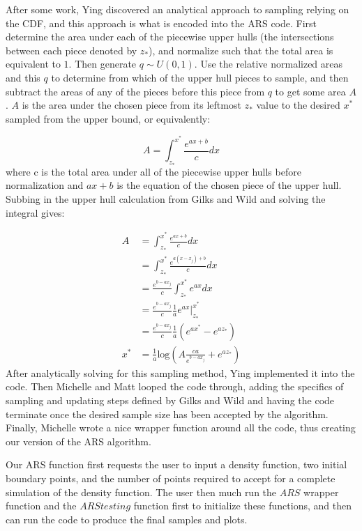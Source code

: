 \documentclass{article}
\begin{document}
After some work, Ying discovered an analytical approach to sampling relying on the CDF, and this approach is what is encoded into the ARS code.  First determine the area under each of the piecewise upper hulls (the intersections between each piece denoted by $z_*$), and normalize such that the total area is equivalent to $1$.  Then generate $q\sim U\left(0, 1\right)$.  Use the relative normalized areas and this $q$ to determine from which of the upper hull pieces to sample, and then subtract the areas of any of the pieces before this piece from $q$ to get some area $A$.  $A$ is the area under the chosen piece from its leftmost $z_*$ value to the desired $x^*$ sampled from the upper bound, or equivalently:

$$A=\int_{z_*}^{x^*}\frac{e^{ax+b}}{c}dx$$
where c is the total area under all of the piecewise upper hulls before normalization and $ax+b$ is the equation of the chosen piece of the upper hull.  Subbing in the upper hull calculation from Gilks and Wild and solving the integral gives:

\begin{align*}
A &= \int_{z_*}^{x^*}\frac{e^{ax+b}}{c}dx\\
&= \int_{z_*}^{x^*}\frac{e^{a\left(x-x_j\right)+b}}{c}dx\\
&= \frac{e^{b-ax_j}}{c}\int_{z_*}^{x^*}e^{ax}dx\\
&= \frac{e^{b-ax_j}}{c}\frac{1}{a}\left.e^{ax}\right|_{z_*}^{x^*}\\
&= \frac{e^{b-ax_j}}{c}\frac{1}{a}\left(e^{ax^*} - e^{az_*}\right)\\
x^* &= \frac{1}{a}\text{log}\left(A\frac{ca}{e^{b-ax_j}}+e^{az_*}\right)
\end{align*}
After analytically solving for this sampling method, Ying implemented it into the code.  Then Michelle and Matt looped the code through, adding the specifics of sampling and updating steps defined by Gilks and Wild and having the code terminate once the desired sample size has been accepted by the algorithm.  Finally, Michelle wrote a nice wrapper function around all the code, thus creating our version of the ARS algorithm.

Our ARS function first requests the user to input a density function, two initial boundary points, and the number of points required to accept for a complete simulation of the density function. The user then much run the $ARS$ wrapper function and the $ARS testing$ function first to initialize these functions, and then can run the code to produce the final samples and plots. 
\end{document}
